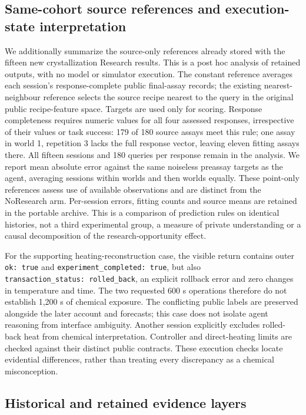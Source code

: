 \documentclass[10pt,a4paper]{article}
\begin{document}
\subsection{Same-cohort source references and execution-state interpretation}\label{same-cohort-source-references-and-execution-state-interpretation}

We additionally summarize the source-only references already stored with the fifteen new crystallization Research results. This is a post hoc analysis of retained outputs, with no model or simulator execution. The constant reference averages each session's response-complete public final-assay records; the existing nearest-neighbour reference selects the source recipe nearest to the query in the original public recipe-feature space. Targets are used only for scoring. Response completeness requires numeric values for all four assessed responses, irrespective of their values or task success: 179 of 180 source assays meet this rule; one assay in world 1, repetition 3 lacks the full response vector, leaving eleven fitting assays there. All fifteen sessions and 180 queries per response remain in the analysis. We report mean absolute error against the same noiseless preassay targets as the agent, averaging sessions within worlds and then worlds equally. These point-only references assess use of available observations and are distinct from the NoResearch arm. Per-session errors, fitting counts and source means are retained in the portable archive. This is a comparison of prediction rules on identical histories, not a third experimental group, a measure of private understanding or a causal decomposition of the research-opportunity effect.

For the supporting heating-reconstruction case, the visible return contains outer \texttt{ok:\ true} and \texttt{experiment\_completed:\ true}, but also \texttt{transaction\_status:\ rolled\_back}, an explicit rollback error and zero changes in temperature and time. The two requested 600 s operations therefore do not establish 1,200 s of chemical exposure. The conflicting public labels are preserved alongside the later account and forecasts; this case does not isolate agent reasoning from interface ambiguity. Another session explicitly excludes rolled-back heat from chemical interpretation. Controller and direct-heating limits are checked against their distinct public contracts. These execution checks locate evidential differences, rather than treating every discrepancy as a chemical misconception.

\subsection{Historical and retained evidence layers}\label{historical-and-retained-evidence-layers}
\end{document}
